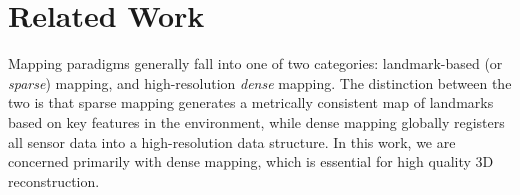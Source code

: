\documentclass[10pt,twocolumn,letterpaper]{article}
\begin{document}
\section{Related Work}
Mapping paradigms generally fall into one of two categories:
landmark-based (or \emph{sparse}) mapping, and high-resolution \emph{dense}
mapping. The distinction between the two is that sparse mapping generates a
metrically consistent map of landmarks based on key features in the
environment, while dense mapping globally registers all sensor data into a
high-resolution data structure. In this work, we are concerned primarily with
dense mapping, which is essential for high quality 3D reconstruction.
\end{document}
